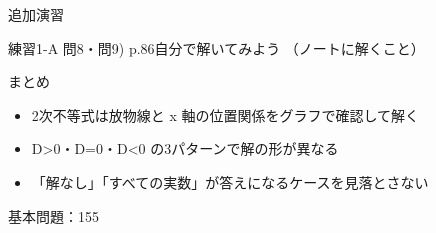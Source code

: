 \documentclass[aspectratio=43,professionalfonts,handout]{beamer}
\begin{document}
\begin{frame}{追加演習}
  \begin{block}{練習1-A 問8・問9) p.86\quad 自分で解いてみよう}
    （ノートに解くこと）
  \end{block}
\end{frame}

\begin{frame}{まとめ}
  \begin{itemize}
    \item 2次不等式は放物線と x 軸の位置関係をグラフで確認して解く
    \item D>0・D=0・D<0 の3パターンで解の形が異なる
    \item 「解なし」「すべての実数」が答えになるケースを見落とさない
  \end{itemize}

  \vfill
  {\small 基本問題：155}
\end{frame}
\end{document}
